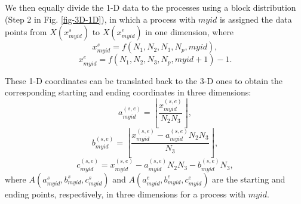 We then equally divide the 1-D data to the processes using a block distribution (Step 2 in Fig. \ref{fig-3D-1D}), in which a process with $myid$ is assigned the data points from $X(x^{s}_{myid})$ to $X(x^{e}_{myid})$ in one dimension, where
\begin{equation}
x^{s}_{myid}=f(N_1,N_2,N_3,N_p,myid),
\end{equation}
\begin{equation}
x^{e}_{myid}=f(N_1,N_2,N_3,N_p,myid+1)-1.
\end{equation}

These 1-D coordinates can be translated back to the 3-D ones to obtain the corresponding starting and ending coordinates in three dimensions:  
\begin{equation}
\label{eq-3D-ase}
a^{(s,e)}_{myid}=\left \lfloor \frac{x^{(s,e)}_{myid}}{N_2N_3} \right \rfloor ,
\end{equation}
\begin{equation}
\label{eq-3D-bse}
b^{(s,e)}_{myid}=\left \lfloor \frac{x^{(s,e)}_{myid}-a^{(s,e)}_{myid}N_2N_3}{N_3} \right \rfloor ,
\end{equation}
\begin{equation}
\label{eq-3D-cse}
c^{(s,e)}_{myid}=x^{(s,e)}_{myid}-a^{(s,e)}_{myid}N_2N_3-b^{(s,e)}_{myid}N_3,
\end{equation}
where $A(a^{s}_{myid},b^{s}_{myid},c^{s}_{myid})$ and $A(a^{e}_{myid},b^{e}_{myid},c^{e}_{myid})$ are the starting and ending points, respectively, in three dimensions for a process with $myid$.

